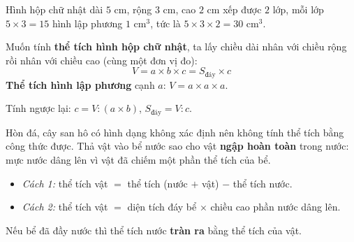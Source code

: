 \begin{knowbox}
\begin{minipage}[t]{0.6\linewidth}
Hình hộp chữ nhật dài $5$ cm, rộng $3$ cm, cao $2$ cm xếp được $2$ lớp, mỗi lớp $5\times3=15$ hình lập phương $1$ cm$^3$, tức là $5\times3\times2=30$ cm$^3$.\par
\smallskip
Muốn tính \textbf{thể tích hình hộp chữ nhật}, ta lấy chiều dài nhân với chiều rộng rồi nhân với chiều cao (cùng một đơn vị đo):
\[V=a\times b\times c=S_{\text{đáy}}\times c\]
\textbf{Thể tích hình lập phương} cạnh $a$: \quad $V=a\times a\times a$.\par
\smallskip
Tính ngược lại: \quad $c=V:(a\times b)$, \quad $S_{\text{đáy}}=V:c$.
\end{minipage}\hfill
\begin{minipage}[t]{0.36\linewidth}\vspace{6pt}\centering
{}
\end{minipage}
\end{knowbox}
\begin{knowbox}
Hòn đá, cây san hô có hình dạng không xác định nên không tính thể tích bằng công thức được. Thả vật vào bể nước sao cho vật \textbf{ngập hoàn toàn} trong nước: mực nước dâng lên vì vật đã chiếm một phần thể tích của bể.
\begin{itemize}[leftmargin=1.2em,itemsep=1pt,topsep=2pt]
\item \emph{Cách 1:} thể tích vật $=$ thể tích (nước $+$ vật) $-$ thể tích nước.
\item \emph{Cách 2:} thể tích vật $=$ diện tích đáy bể $\times$ chiều cao phần nước dâng lên.
\end{itemize}
Nếu bể đã đầy nước thì thể tích nước \textbf{tràn ra} bằng thể tích của vật.
\end{knowbox}
\gap
